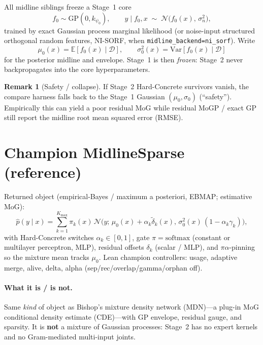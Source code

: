 \documentclass[11pt,a4paper]{article}
\newcommand{\E}{\mathbb{E}}
\newcommand{\Ncal}{\mathcal{N}}
\newcommand{\Dcal}{\mathcal{D}}
\newcommand{\Kmax}{K_{\max}}
\theoremstyle{definition}
\newtheorem{remark}{Remark}
\begin{document}
All midline siblings freeze a Stage~1 core
\[
  f_0\sim\mathrm{GP}(0,k_{\psi_0}),
  \qquad
  y\mid f_0,x \;\sim\; \Ncal\!\bigl(f_0(x),\,\sigma_n^2\bigr),
\]
trained by exact Gaussian process marginal likelihood (or noise-input structured
orthogonal random features, NI-SORF, when
\texttt{midline\_backend=ni\_sorf}). Write
\[
  \mu_0(x)=\E[f_0(x)\mid\Dcal],
  \qquad
  \sigma_0^2(x)=\mathrm{Var}[f_0(x)\mid\Dcal]
\]
for the posterior midline and envelope. Stage~1 is then \emph{frozen}: Stage~2
never backpropagates into the core hyperparameters.

\begin{remark}[Safety / collapse]
If Stage~2 Hard-Concrete survivors vanish, the compare harness falls back to the
Stage~1 Gaussian $(\mu_0,\sigma_0)$ (``safety''). Empirically this can yield a
poor residual MoG while residual MoGP / exact GP still report the midline root
mean squared error (RMSE).
\end{remark}

\section{Champion MidlineSparse (reference)}
\label{sec:champion}

Returned object (empirical-Bayes / maximum a posteriori, EBMAP; estimative MoG):
\begin{equation}
\label{eq:champion-mog}
  \hat p(y\mid x)
  =
  \sum_{k=1}^{\Kmax}
  \pi_k(x)\,
  \Ncal\!\bigl(
    y;\,
    \mu_0(x)+\alpha_k\tilde\delta_k(x),\,
    \sigma_0^2(x)\,(1-\alpha_k\gamma_k)
  \bigr),
\end{equation}
with Hard-Concrete switches $\alpha_k\in[0,1]$, gate $\pi=\mathrm{softmax}$
(constant or multilayer perceptron, MLP), residual offsets $\delta_k$
(scalar / MLP), and $\pi\alpha$-pinning so the mixture mean tracks $\mu_0$.
Lean champion controllers: usage, adaptive merge, alive, delta, alpha
(sep/rec/overlap/gamma/orphan off).

\paragraph{What it is / is not.}
Same \emph{kind} of object as Bishop's mixture density network (MDN)---a plug-in
MoG conditional density estimate (CDE)---with GP envelope, residual gauge, and
sparsity.
It is \textbf{not} a mixture of Gaussian processes: Stage~2 has no expert kernels
and no Gram-mediated multi-input joints.
\end{document}
